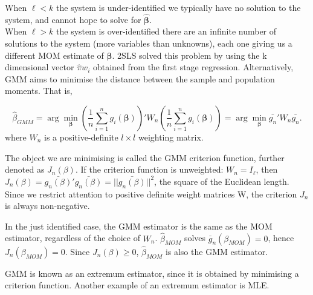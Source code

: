 \documentclass[DIV=14,titlepage=false]{scrreprt}
\begin{document}
When $\ell<k$ the system is  under-identified we typically have no solution to the system, and cannot hope to solve for $\boldsymbol{\hat\beta}$. \\
When $\ell>k$ the system is over-identified there are an infinite number of solutions to the system (more variables than unknowns), each one giving us a different MOM estimate of $\boldsymbol{\beta}$. 2SLS solved this problem by using the k dimensional vector $\hat\pi w_i$ obtained from the first stage regression. Alternatively, GMM aims to minimise the distance between the sample and population moments. That is,
\begin{definition}
    \[\hat\beta_{GMM}=\arg \min_{\boldsymbol{\beta}} \left(\frac{1}{n}\sum_{i=1}^{n}g_i(\boldsymbol{\beta})\right)' W_n \left(\frac{1}{n}\sum_{i=1}^{n}g_i(\boldsymbol{\beta})\right)=\arg \min_{\boldsymbol{\beta}} \bar{g_n}' W_n \bar{g_n}.\]
    where $W_n$ is a positive-definite $l\times l$ weighting matrix.
\end{definition}
 The object we are minimising is called the GMM criterion function, further denoted as $J_n (\beta)$. If the criterion function is unweighted: $W_n=I_{\ell}$, then $J_n(\beta)=\bar{g_n(\beta)}' \bar{g_n(\beta)}=||\bar{g_n(\beta)}||^2$, the square of the Euclidean length. Since we restrict attention to positive definite weight matrices W, the criterion $J_n$ is always non-negative.
 \begin{note}
    In the just identified case, the GMM estimator is the same as the MOM estimator, regardless of the choice of $W_n$. $\hat\beta_{MOM}$ solves $\bar g_n(\beta_{MOM})=0$, hence $J_n(\beta_{MOM})=0$. Since $J_n(\beta)\geq 0$, $\hat\beta_{MOM}$ is also the GMM estimator.
 \end{note}

 GMM is known as an extremum estimator, since it is obtained by minimising a criterion function. Another example of an extremum estimator is MLE.
\end{document}
